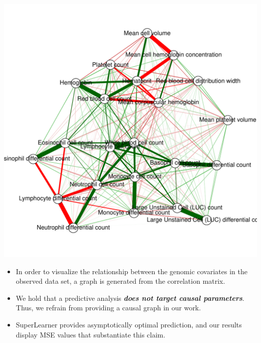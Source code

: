 \documentclass[landscape,a0paper,fontscale=0.285]{baposter} %
\begin{document}
\begin{poster}
{\begin{multicols}{2}
\begin{center}
\vspace*{-0.51cm}
\includegraphics[scale=0.285]{genes_correlationGraph.pdf}
\vspace{-1.8em}
\end{center}


\begin{itemize}
\item In order to visualize the relationship between the genomic covariates in
  the observed data set, a graph is generated from the correlation matrix.
\item We hold that a predictive analysis \textbf{\textit{does not target causal
  parameters}}. Thus, we refrain from providing a causal graph in our work.
\item SuperLearner provides asymptotically optimal prediction, and our results
  display MSE values that substantiate this claim.
\end{itemize}

\end{multicols}
}



\end{poster}
\end{document}

